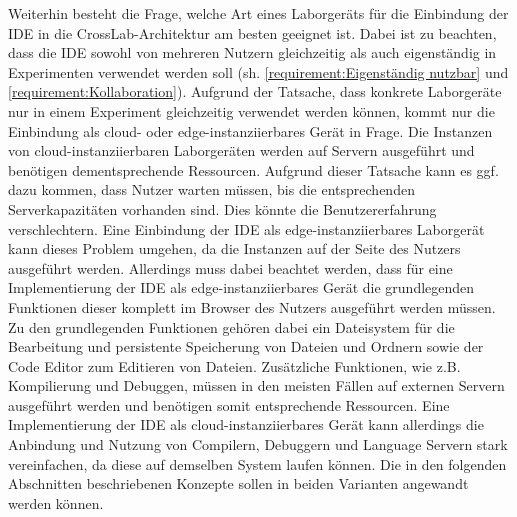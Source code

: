 Weiterhin besteht die Frage, welche Art eines Laborgeräts für die Einbindung der IDE in die CrossLab-Architektur am besten geeignet ist. Dabei ist zu beachten, dass die IDE sowohl von mehreren Nutzern gleichzeitig als auch eigenständig in Experimenten verwendet werden soll (sh. \autoref{requirement:Eigenständig nutzbar} und \autoref{requirement:Kollaboration}). Aufgrund der Tatsache, dass konkrete Laborgeräte nur in einem Experiment gleichzeitig verwendet werden können, kommt nur die Einbindung als cloud- oder edge-instanziierbares Gerät in Frage. Die Instanzen von cloud-instanziierbaren Laborgeräten werden auf Servern ausgeführt und benötigen dementsprechende Ressourcen. Aufgrund dieser Tatsache kann es ggf. dazu kommen, dass Nutzer warten müssen, bis die entsprechenden Serverkapazitäten vorhanden sind. Dies könnte die Benutzererfahrung verschlechtern. Eine Einbindung der IDE als edge-instanziierbares Laborgerät kann dieses Problem umgehen, da die Instanzen auf der Seite des Nutzers ausgeführt werden. Allerdings muss dabei beachtet werden, dass für eine Implementierung der IDE als edge-instanziierbares Gerät die grundlegenden Funktionen dieser komplett im Browser des Nutzers ausgeführt werden müssen. Zu den grundlegenden Funktionen gehören dabei ein Dateisystem für die Bearbeitung und persistente Speicherung von Dateien und Ordnern sowie der Code Editor zum Editieren von Dateien. Zusätzliche Funktionen, wie z.B. Kompilierung und Debuggen, müssen in den meisten Fällen auf externen Servern ausgeführt werden und benötigen somit entsprechende Ressourcen. Eine Implementierung der IDE als cloud-instanziierbares Gerät kann allerdings die Anbindung und Nutzung von Compilern, Debuggern und Language Servern stark vereinfachen, da diese auf demselben System laufen können. Die in den folgenden Abschnitten beschriebenen Konzepte sollen in beiden Varianten angewandt werden können.
